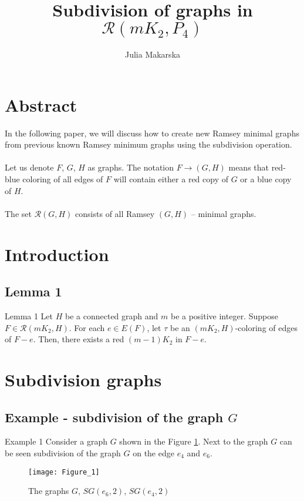 \documentclass{beamer}
\title{Subdivision of graphs in $\mathcal{R}(mK_2,P_4)$}
\author {Julia Makarska}
\date[\empty]
\theoremstyle{definition}
\begin{document}
	
\begin{frame}
	\maketitle
\end{frame}
\section{Abstract}
\begin{frame}
		{
		In the following paper, we will discuss how to create new Ramsey minimal graphs from previous known Ramsey minimum  graphs using the subdivision operation.\\~\\
		}
	\uncover<2->
	{
		Let us denote $F$, $G$, $H$ as graphs. The notation $F\to(G,H)$ means that red-blue coloring of all edges of $F$ will contain either a red copy of $G$ or a blue copy of $H$.\\~\\
	}
	\uncover<3->
	{
		The set $\mathcal{R}(G,H)$ consists of all Ramsey $(G,H)$ -- minimal graphs.
	}
\end{frame}

\section{Introduction}
	\subsection{Lemma 1}
\begin{frame}
	{
		\begin{block}{Lemma 1}
		Let $H$ be a connected graph and $m$ be a positive integer. 
		Suppose $F\in\mathcal{R}(mK_2,H)$. For each $e\in E(F)$, let $\tau$ be an $(mK_2,H)$-coloring of edges of $F-e$. Then, there exists a red $(m-1)K_2$ in $F-e$.
		\end{block}
	}
\end{frame}

\section{Subdivision graphs}
	\subsection{Example - subdivision of the graph $G$}
\begin{frame}
	{
		\begin{block}{Example 1}
		Consider a graph $G$ shown in the Figure \ref{fig:f1}. Next to the graph $G$ can be seen subdivision of the graph $G$ on the edge $e_4$ and $e_6$.
		\end{block}
	}
	{
	\begin{figure}[h]
		\centering
		\texttt{[image: Figure\_1]}
		\caption{The graphs $G$, $SG(e_6,2)$, $SG(e_4,2)$}
		\label{fig:f1}
	\end{figure}
}
\end{frame}
\end{document}
